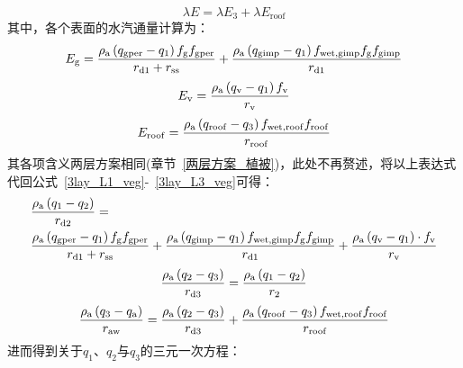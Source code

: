%
\begin{equation}\label{3lay_L3_veg}
  \lambda E = \lambda E_{3} + \lambda E_{\mathrm{roof}}
\end{equation}
其中，各个表面的水汽通量计算为：
\begin{equation}\label{3lay_Eg_veg}
  E_{\mathrm{g}} = \frac{\rho _{\rm a} \left( q_{\mathrm{gper}}-q_{1} \right) f_{\mathrm{g}} f_{\mathrm{gper}}}{r_{\mathrm{d1}}+r_{\mathrm{ss}}} + \frac{\rho _{\rm a} \left( q_{\mathrm{gimp}}-q_{1} \right) f_{\mathrm{wet,gimp}} f_{\mathrm{g}}  f_{\mathrm{gimp}}}{r_{\mathrm{d1}}}
\end{equation}
%
\begin{equation}
  E_{\mathrm{v}} = \frac{\rho _{\rm a} \left( q_{\mathrm{v}}-q_{1}\right) f_{\rm v}}{r_{\mathrm{v}}}
\end{equation}
%
\begin{equation}\label{3lay_Eroof_veg}
  E_{\mathrm{roof}} = \frac{\rho _{\rm a} \left( q_{\mathrm{roof}}-q_{3}\right) f_{\mathrm{wet,roof}} f_{\mathrm{roof}}}{r_{\mathrm{roof}}}
\end{equation}
其各项含义两层方案相同(章节~\ref{两层方案_植被})，此处不再赘述，将以上表达式代回公式~\eqref{3lay_L1_veg}-~\eqref{3lay_L3_veg}可得：
\begin{equation}
  \begin{split}
    & \frac{\rho _{\rm a} \left( q_{1}-q_{2}\right)}{r_{\mathrm{d2}}} = \\
    & \frac{\rho _{\rm a} \left( q_{\mathrm{gper}}-q_{1}\right) f_{\mathrm{g}} f_{\mathrm{gper}}}{r_{\mathrm{d1}}+r_{\mathrm{ss}}} + \frac{\rho _{\rm a} \left( q_{\mathrm{gimp}}-q_{1} \right) f_{\mathrm{wet,gimp}} f_{\mathrm{g}} f_{\mathrm{gimp}}}{r_{\mathrm{d1}}} + \frac{\rho _{\rm a} \left( q_{\mathrm{v}}-q_{1}\right) \cdot f_{\rm v}}{r_{\mathrm{v}}}
  \end{split}
\end{equation}
%
\begin{equation}
  \frac{\rho _{\rm a} \left( q_{2} - q_{3}\right)}{r_{\mathrm{d3}}} = \frac{\rho _{\rm a} \left( q_{1} - q_{2}\right)}{r_{2}}
\end{equation}
%
\begin{equation}
  \frac{\rho _{\rm a} \left( q_{3} - q_{\rm a}\right)}{r_{\mathrm{aw}}} = \frac{\rho _{\rm a} \left( q_{2} - q_{3}\right)}{r_{\mathrm{d3}}} + \frac{\rho _{\rm a} \left( q_{\mathrm{roof}}-q_{3}\right) f_{\mathrm{wet,roof}} f_{\mathrm{roof}}}{r_{\mathrm{roof}}}
\end{equation}
进而得到关于$q_{1}$、$q_{2}$与$q_{3}$的三元一次方程：

